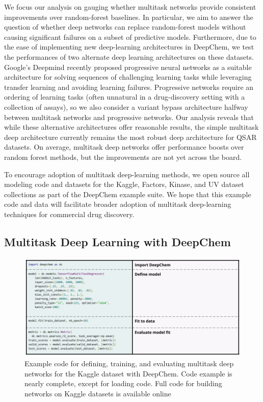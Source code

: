 We focus our analysis on gauging whether multitask networks provide consistent improvements over random-forest baselines. In particular, we aim to answer the question of whether deep networks can replace random-forest models without causing significant failures on a subset of predictive models. Furthermore, due to the ease of implementing new deep-learning architectures in DeepChem, we test the performances of two alternate deep learning architectures on these datasets. Google's Deepmind recently proposed progressive neural networks as a suitable architecture for solving sequences of challenging learning tasks \cite{rusu2016progressive} while leveraging transfer learning and avoiding learning failures. Progressive networks require an ordering of learning tasks (often unnatural in a drug-discovery setting with a collection of assays), so we also consider a variant bypass architecture halfway between multitask networks and progressive networks. Our analysis reveals that while these alternative architectures offer reasonable results, the simple multitask deep architecture currently remains the most robust deep architecture for QSAR datasets. On average, multitask deep networks offer performance boosts over random forest methods, but the improvements are not yet across the board.

To encourage adoption of multitask deep-learning methods, we open source all modeling code and datasets for the Kaggle, Factors, Kinase, and UV dataset collections as part of the DeepChem example suite. We hope that this example code and data will facilitate broader adoption of multitask deep-learning techniques for commercial drug discovery.

\subsection{Multitask Deep Learning with DeepChem}
\begin{figure}
  \includegraphics[width=\textwidth]{Images/deepchem_code.png}
  \caption{Example code for defining, training, and evaluating multitask deep networks for the Kaggle dataset with DeepChem. Code example is nearly complete, except for loading code. Full code for building networks on Kaggle datasets is available online}
  \label{fig:code}
\end{figure}

